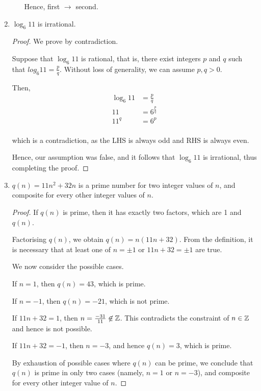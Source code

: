\begin{enumerate}
\begin{enumerate}
        Hence, first $\rightarrow$ second.

    \end{enumerate}

\item
    \begin{theorem}
        $\log_6 11$ is irrational.
    \end{theorem}
    \begin{proof}
        We prove by contradiction.

        Suppose that $\log_6 11$ is rational, that is, there exist
        integers $p$ and $q$ such that $log_6 11 = \frac{p}{q}$.
        Without loss of generality, we can assume $p, q > 0$.

        Then,
        \begin{align*}
            \log_6 11 &= \frac{p}{q} \\
            11 &= 6^\frac{p}{q} \\
            11^q &= 6^p \\
        \end{align*}

        which is a contradiction, as the LHS is always odd and RHS is
        always even.

        Hence, our assumption was false, and it follows that $\log_6 11$
        is irrational, thus completing the proof.
    \end{proof}

\item
    \begin{theorem}
        $q(n) = 11n^2 + 32n$ is a prime number for two integer values
        of $n$, and composite for every other integer values of $n$.
    \end{theorem}
    \begin{proof}
        If $q(n)$ is prime, then it has exactly two factors, which are
        1 and $q(n)$.

        Factorising $q(n)$, we obtain $q(n) = n(11n+32)$.
        From the definition, it is necessary that at least one of
        $n = \pm 1$ or $11n + 32 = \pm 1$ are true.

        We now consider the possible cases.

        If $n = 1$,  then $q(n) = 43$, which is prime.

        If $n = -1$, then $q(n) = -21$, which is not prime.

        If $11n + 32 = 1$, then $n = \frac{-31}{11} \not \in \mathbb{Z}$.
        This contradicts the constraint of $n \in \mathbb{Z}$ and hence is not
        possible.

        If $11n + 32 = -1$, then $n = -3$, and hence $q(n) = 3$,
        which is prime.

        By exhaustion of possible cases where $q(n)$ can be prime, we
        conclude that $q(n)$ is prime in only two cases (namely, $n=1$
        or $n=-3$), and composite for every other integer value of $n$.
    \end{proof}
\end{enumerate}
